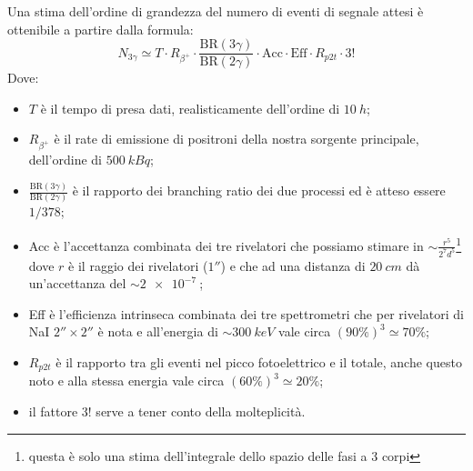 Una stima dell'ordine di grandezza del numero di eventi di segnale attesi è ottenibile a partire dalla formula:
\begin{equation}
\label{eq:stima_3gamma}
N_{3\gamma} \simeq T \cdot R_{\beta^+} \cdot \frac{\text{BR}(3\gamma)}{\text{BR}(2\gamma)} \cdot \text{Acc} \cdot \text{Eff} \cdot R_{p2t} \cdot 3!
\end{equation}
Dove:
\begin{itemize}
	\item $T$ è il tempo di presa dati, realisticamente dell'ordine di $\SI{10}{h}$;
	\item $R_{\beta^+}$ è il rate di emissione di positroni della nostra sorgente principale, dell'ordine di $\SI{500}{kBq}$;
	\item $\frac{\text{BR}(3\gamma)}{\text{BR}(2\gamma)}$ è il rapporto dei branching ratio dei due processi ed è atteso essere $1/378$;
	\item Acc è l'accettanza combinata dei tre rivelatori che possiamo stimare in $\sim \frac{r^5}{2^7 d^5}$\footnote{questa è solo una stima dell'integrale dello spazio delle fasi a 3 corpi} dove $r$ è il raggio dei rivelatori ($1''$) e che ad una distanza di $\SI{20}{cm}$ dà un'accettanza del $\sim\SI{2e-7}{}$;
	\item Eff è l'efficienza intrinseca combinata dei tre spettrometri che per rivelatori di NaI $2''\times2''$ è nota \cite{knoll} e all'energia di $\sim \SI{300}{keV}$ vale circa $(90\%)^3 \simeq  70\%$;
	\item $R_{p2t}$ è il rapporto tra gli eventi nel picco fotoelettrico e il totale, anche questo noto \cite{knoll} e alla stessa energia vale circa $(60\%)^3 \simeq 20\%$;
	\item il fattore $3!$ serve a tener conto della molteplicità.
\end{itemize}
